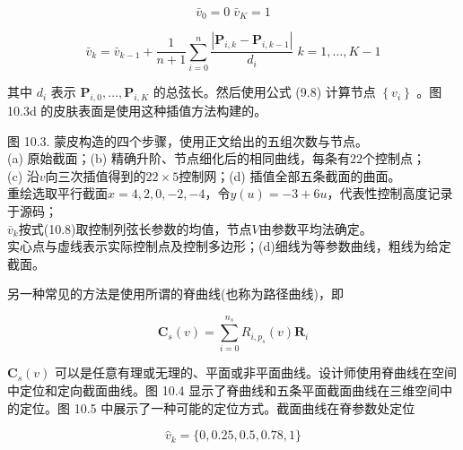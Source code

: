 \documentclass[../main.tex]{subfiles}
\begin{document}
\[
{\bar{v}}_{0} = 0\;{\bar{v}}_{K} = 1
\]

\[
{\bar{v}}_{k} = {\bar{v}}_{k - 1} + \frac{1}{n + 1}\mathop{\sum }\limits_{{i = 0}}^{n}\frac{\left| {\mathbf{P}}_{i,k} - {\mathbf{P}}_{i,k - 1}\right| }{{d}_{i}}\;k = 1,\ldots ,K - 1 \tag{10.8}
\]

其中 \({d}_{i}\) 表示 \({\mathbf{P}}_{i,0},\ldots ,{\mathbf{P}}_{i,K}\) 的总弦长。然后使用公式 (9.8) 计算节点 \(\left\{  {v}_{i}\right\}\) 。图 10.3d 的皮肤表面是使用这种插值方法构建的。

\begin{center}
\begin{minipage}{30cm}
\vspace*{.6\baselineskip}
\centering
{}\par\vspace{.5cm}
\par\vspace{.5cm}
\par\smallskip
图 10.3. 蒙皮构造的四个步骤，使用正文给出的五组次数与节点。\\
(a) 原始截面；(b) 精确升阶、节点细化后的相同曲线，每条有$22$个控制点；\\
(c) 沿$v$向三次插值得到的$22\times5$控制网；(d) 插值全部五条截面的曲面。\\
重绘选取平行截面$x=4,2,0,-2,-4$，令$y(u)=-3+6u$，代表性控制高度记录于源码；\\
$\bar v_k$按式(10.8)取控制列弦长参数的均值，节点$V$由参数平均法确定。\\
实心点与虚线表示实际控制点及控制多边形；(d)细线为等参数曲线，粗线为给定截面。
\end{minipage}
\end{center}

另一种常见的方法是使用所谓的脊曲线(也称为路径曲线)，即

\[
{\mathbf{C}}_{s}\left( v\right)  = \mathop{\sum }\limits_{{i = 0}}^{{n}_{s}}{R}_{i,{p}_{s}}\left( v\right) {\mathbf{R}}_{i} \tag{10.9}
\]

\({\mathbf{C}}_{s}\left( v\right)\) 可以是任意有理或无理的、平面或非平面曲线。设计师使用脊曲线在空间中定位和定向截面曲线。图 10.4 显示了脊曲线和五条平面截面曲线在三维空间中的定位。图 10.5 中展示了一种可能的定位方式。截面曲线在脊参数处定位

\[
{\widehat{v}}_{k} = \{ 0,{0.25},{0.5},{0.78},1\}
\]
\end{document}
